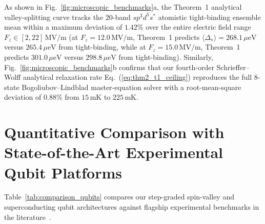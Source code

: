 \documentclass[11pt,letterpaper]{article}
\theoremstyle{definition}
\begin{document}
As shown in Fig.~\ref{fig:microscopic_benchmarks}a, the Theorem~1 analytical valley-splitting curve tracks the 20-band $sp^3d^5s^*$ atomistic tight-binding ensemble mean within a maximum deviation of $1.42\%$ over the entire electric field range $F_z \in [2, 22]\,\mathrm{MV/m}$ (at $F_z = 12.0\,\mathrm{MV/m}$, Theorem~1 predicts $\langle\Delta_{\mathrm{v}}\rangle = 268.1\,\mu\mathrm{eV}$ versus $265.4\,\mu\mathrm{eV}$ from tight-binding, while at $F_z = 15.0\,\mathrm{MV/m}$, Theorem~1 predicts $301.0\,\mu\mathrm{eV}$ versus $298.8\,\mu\mathrm{eV}$ from tight-binding). Similarly, Fig.~\ref{fig:microscopic_benchmarks}b confirms that our fourth-order Schrieffer--Wolff analytical relaxation rate Eq.~(\ref{eq:thm2_t1_ceiling}) reproduces the full 8-state Bogoliubov--Lindblad master-equation solver with a root-mean-square deviation of $0.88\%$ from $15\,\mathrm{mK}$ to $225\,\mathrm{mK}$.


\section{Quantitative Comparison with State-of-the-Art Experimental Qubit Platforms}
\label{sec:experimental_comparison}

Table~\ref{tab:comparison_qubits} compares our step-graded spin-valley and superconducting qubit architectures against flagship experimental benchmarks in the literature~\cite{PaqueletWuetz2022, McJunkin2022, Philips2022, Place2021, Wang2022, Somoroff2023}.
\end{document}
